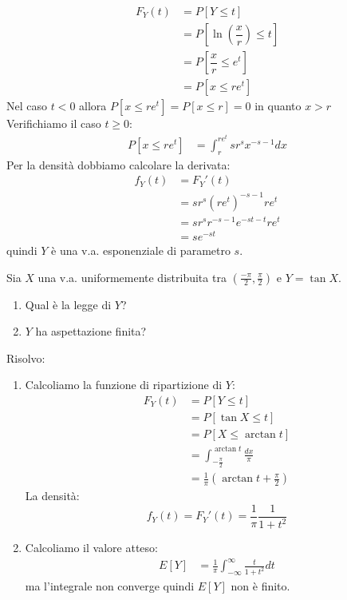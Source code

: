 \documentclass[12pt]{report}
\newcounter{exercise}
\begin{document}
\begin{exercise}{}{}
\begin{enumerate}
\begin{align*}
	 			F_Y(t) &= P[Y \leq t] \\
	 			&= P[\ln(\dfrac{x}{r}) \leq t] \\
	 			&= P[\dfrac{x}{r} \leq e^t] \\
	 			&= P[x \leq re^t]
	 		\end{align*}
	 		Nel caso $t < 0$ allora $P[x \leq re^t] = P[x \leq r] = 0$ in quanto $x > r$ \\
	 		Verifichiamo il caso $t \geq 0$:
	 		\begin{align*}
	 			P[x \leq re^t] &= \int_{r}^{re^t}sr^sx^{-s-1}dx
	 		\end{align*}
	 		Per la densità dobbiamo calcolare la derivata:
	 		\begin{align*}
	 			f_Y(t) &= F_Y'(t) \\
	 			&= sr^s(re^t)^{-s-1}re^t \\
	 			&=sr^sr^{-s-1}e^{-st-t}re^t \\
	 			&=se^{-st}
	 		\end{align*}
			quindi $Y$ è una v.a. esponenziale di parametro $s$.
	 	\end{enumerate}
	 \end{exercise}
	 \begin{exercise}{}{}
	 	\begin{assignment}{}{}
	 		Sia $X$ una v.a. uniformemente distribuita tra $(\frac{-\pi}{2}, \frac{\pi}{2})$ e $Y = \tan X$.
	 		\begin{enumerate}
	 			\item Qual è la legge di $Y$?
	 			\item $Y$ ha aspettazione finita?
	 		\end{enumerate}
	 	\end{assignment}
	 	Risolvo:
	 	\begin{enumerate}
	 		\item Calcoliamo la funzione di ripartizione di $Y$:
	 		\begin{align*}
	 			F_Y(t) &= P[Y \leq t] \\
	 			&= P[\tan X \leq t] \\
	 			&= P[X \leq \arctan t] \\
	 			&= \int_{-\frac{\pi}{2}}^{\arctan t}\frac{dx}{\pi} \\
	 			&= \frac{1}{\pi}(\arctan t + \frac{\pi}{2})
	 		\end{align*}
	 		La densità:
	 		\[
	 		f_Y(t) = F_Y'(t) = \frac{1}{\pi}\frac{1}{1 + t^2}
	 		\]
	 		\item Calcoliamo il valore atteso:
	 		\begin{align*}
	 			E[Y] &= \frac{1}{\pi}\int_{-\infty}^{\infty}\frac{t}{1+t^2}dt
	 		\end{align*}
	 		ma l'integrale non converge quindi $E[Y]$ non è finito.
	 	\end{enumerate}
	 \end{exercise}
\end{document}
